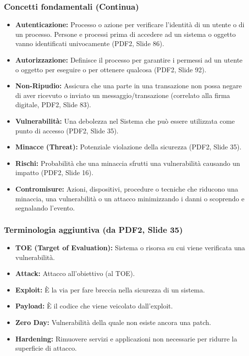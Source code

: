 \documentclass{beamer}
\begin{document}
\begin{frame}
  \frametitle{Concetti fondamentali (Continua)}
  \begin{itemize}
    \item \textbf{Autenticazione:} Processo o azione per verificare l’identità di un utente o di un processo. Persone e processi prima di accedere ad un sistema o oggetto vanno identificati univocamente (PDF2, Slide 86).
    \item \textbf{Autorizzazione:} Definisce il processo per garantire i permessi ad un utente o oggetto per eseguire o per ottenere qualcosa (PDF2, Slide 92).
    \item \textbf{Non-Ripudio:} Assicura che una parte in una transazione non possa negare di aver ricevuto o inviato un messaggio/transazione (correlato alla firma digitale, PDF2, Slide 83).
    \pause
    \item \textbf{Vulnerabilità:} Una debolezza nel Sistema che può essere utilizzata come punto di accesso (PDF2, Slide 35).
    \item \textbf{Minacce (Threat):} Potenziale violazione della sicurezza (PDF2, Slide 35).
    \item \textbf{Rischi:} Probabilità che una minaccia sfrutti una vulnerabilità causando un impatto (PDF2, Slide 16).
    \item \textbf{Contromisure:} Azioni, dispositivi, procedure o tecniche che riducono una minaccia, una vulnerabilità o un attacco minimizzando i danni o scoprendo e segnalando l'evento.
  \end{itemize}
\end{frame}

\begin{frame}
    \frametitle{Terminologia aggiuntiva (da PDF2, Slide 35)}
    \begin{itemize}
        \item \textbf{TOE (Target of Evaluation):} Sistema o risorsa su cui viene verificata una vulnerabilità.
        \item \textbf{Attack:} Attacco all’obiettivo (al TOE).
        \item \textbf{Exploit:} È la via per fare breccia nella sicurezza di un sistema.
        \item \textbf{Payload:} È il codice che viene veicolato dall’exploit.
        \item \textbf{Zero Day:} Vulnerabilità della quale non esiste ancora una patch.
        \item \textbf{Hardening:} Rimuovere servizi e applicazioni non necessarie per ridurre la superficie di attacco.
    \end{itemize}
\end{frame}
\end{document}
